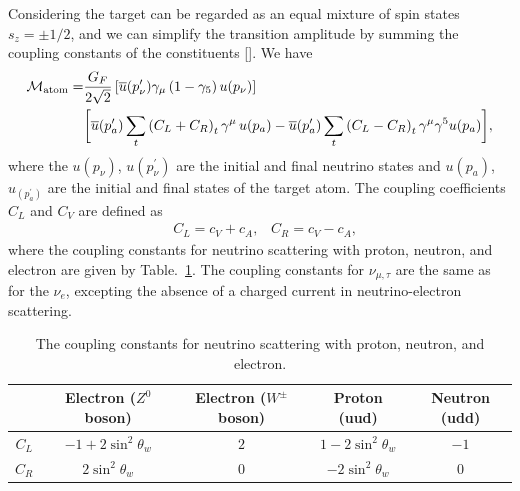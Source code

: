 Considering the target can be regarded as an equal mixture of spin states $s_z=\pm1/2$, and we can simplify the transition amplitude by summing the coupling constants of the constituents [\cite{PhysRevD.21.663,Sehgal:1986gn}]. We have
\begin{align}
\label{Transition}
\mathcal{M}_\mathrm{atom}=&\frac{G_F}{2\sqrt{2}}\left[\overline{u}(p^\prime_\nu)\gamma_\mu\left(1-\gamma_5\right)u(p_\nu)\right]\notag\\&\bigg[\overline{u}(p^\prime_{a})\sum_t\left(C_L+C_R\right)_t\gamma^\mu\,u(p_{a})-\overline{u}(p^\prime_{a})\sum_t\left(C_L-C_R\right)_t\gamma^\mu\gamma^5u(p_{a})\bigg],
\end{align}
where the $u(p_\nu)$, $u(p^\prime_\nu)$ are the initial and final neutrino states and $u(p_a)$, $u_(p^\prime_a)$ are the initial and final states of the target atom. 
The coupling coefficients $C_L$ and $C_V$ are defined as
\begin{align}
&C_L=c_V+c_A,\,\,\,\,\,C_R=c_V-c_A,
\end{align}
where the coupling constants for neutrino scattering with proton, neutron, and electron are given by Table.~\ref{Table_coupling}. The coupling constants for  $\nu_{\mu,\tau}$ are the same as for the $\nu_e$, excepting  the absence  of a charged current in neutrino-electron scattering.
\begin{table}[h]
\begin{tabular}[c]{c|c|c|c|c}
\hline\hline
& Electron ($Z^0$ boson) & Electron ($W^\pm$ boson) & Proton (uud) & Neutron (udd)\\
\hline
$C_L$ & $-1+2\sin^2\theta_w$ & $2$ & $1-2\sin^2\theta_w$ & $-1$ \\
\hline
$C_R$ & $2\sin^2\theta_w$ & $0$ &$-2\sin^2\theta_w$ & $0$ \\
\hline\hline
\end{tabular}
\caption{The coupling constants for neutrino scattering with proton, neutron, and electron.}
\label{Table_coupling}  
\end{table}

